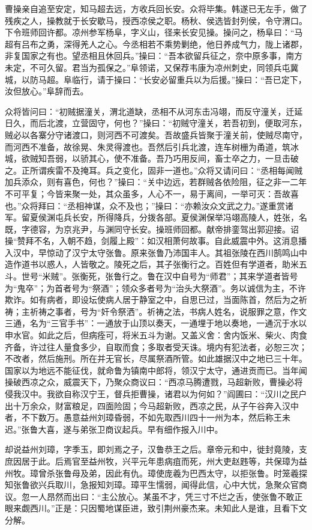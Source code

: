 曹操亲自追至安定，知马超去远，方收兵回长安。众将毕集。韩遂已无左手，做了残疾之人，操教就于长安歇马，授西凉侯之职。杨秋、侯选皆封列侯，令守渭口。下令班师回许都。凉州参军杨阜，字义山，径来长安见操。操问之，杨阜曰：“马超有吕布之勇，深得羌人之心。今丞相若不乘势剿绝，他日养成气力，陇上诸郡，非复国家之有也。望丞相且休回兵。”操曰：“吾本欲留兵征之，奈中原多事，南方未定，不可久留。君当为孤保之。”阜领诺，又保荐韦康为凉州刺史，同领兵屯冀城，以防马超。阜临行，请于操曰：“长安必留重兵以为后援。”操曰：“吾已定下，汝但放心。”阜辞而去。

众将皆问曰：“初贼据潼关，渭北道缺，丞相不从河东击冯翊，而反守潼关，迁延日久，而后北渡，立营固守，何也？”操曰：“初贼守潼关，若吾初到，便取河东，贼必以各寨分守诸渡口，则河西不可渡矣。吾故盛兵皆聚于潼关前，使贼尽南守，而河西不准备，故徐晃、朱灵得渡也。吾然后引兵北渡，连车树栅为甬道，筑冰城，欲贼知吾弱，以骄其心，使不准备。吾乃巧用反间，畜士卒之力，一旦击破之。正所谓疾雷不及掩耳。兵之变化，固非一道也。”众将又请问曰：“丞相每闻贼加兵添众，则有喜色，何也？”操曰：“关中边远，若群贼各依险阻，征之非一二年不可平复；今皆来聚一处，其众虽多，人心不一，易于离间，一举可灭：吾故喜也。”众将拜曰：“丞相神谋，众不及也；”操曰：“亦赖汝众文武之力。”遂重赏诸军。留夏侯渊屯兵长安，所得降兵，分拨各部。夏侯渊保举冯翊高陵人，姓张，名既，字德容，为京兆尹，与渊同守长安。操班师回都。献帝排銮驾出郭迎接。诏操“赞拜不名，入朝不趋，剑履上殿”：如汉相萧何故事。自此威震中外。这消息播入汉中，早惊动了汉宁太守张鲁。原来张鲁乃沛国丰人。其祖张陵在西川鹄鸣山中造作道书以惑人，人皆敬之。陵死之后，其子张衡行之。百姓但有学道者，助米五斗。世号“米贼”。张衡死，张鲁行之。鲁在汉中自号为“师君”；其来学道者皆号为“鬼卒”；为首者号为“祭酒”；领众多者号为“治头大祭酒”。务以诚信为主，不许欺诈。如有病者，即设坛使病人居于静室之中，自思已过，当面陈首，然后为之祈祷；主祈祷之事者，号为“奸令祭洒”。祈祷之法，书病人姓名，说服罪之意，作文三通，名为“三官手书”：一通放于山顶以奏天，一通埋于地以奏地，一通沉于水以申水官。如此之后，但病痊可，将米五斗为谢。又盖义舍：舍内饭米、柴火、肉食齐备，许过往人量食多少，自取而食；多取者受天诛。境内有犯法者，必恕三次；不改者，然后施刑。所在并无官长，尽属祭酒所管。如此雄据汉中之地已三十年。国家以为地远不能征伐，就命鲁为镇南中郎将，领汉宁太守，通进贡而已。当年闻操破西凉之众，威震天下，乃聚众商议曰：“西凉马腾遭戮，马超新败，曹操必将侵我汉中。我欲自称汉宁王，督兵拒曹操，诸君以为何如？”阎圃曰：“汉川之民户出十万余众，财富粮足，四面险固；今马超新败，西凉之民，从子午谷奔入汉中者，不下数万。愚意益州刘璋昏弱，不如先取西川四十一州为本，然后称王未迟。”张鲁大喜，遂与弟张卫商议起兵。早有细作报入川中。

却说益州刘璋，字季玉，即刘焉之子，汉鲁恭王之后。章帝元和中，徙封竟陵，支庶因居于此。后焉官至益州牧，兴平元年患病疽而死，州大吏赵韪等，共保璋为益州牧。璋曾杀张鲁母及弟，因此有仇。璋使庞羲为巴西太守，以拒张鲁。时笼羲探知张鲁欲兴兵取川，急报知刘璋。璋平生懦弱，闻得此信，心中大忧，急聚众官商议。忽一人昂然而出曰：“主公放心。某虽不才，凭三寸不烂之舌，使张鲁不敢正眼来觑西川。”正是：只因蜀地谋臣进，致引荆州豪杰来。未知此人是谁，且看下文分解。